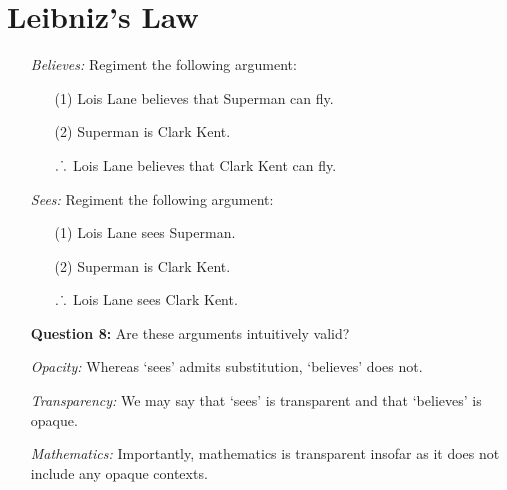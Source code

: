 \documentclass[a4paper, 11pt]{article} %
\def\therefore{\ensuremath{\ldotp\dot\,\ldotp}}
\begin{document}
\section*{Leibniz's Law}

\begin{enumerate}
  \item[\it Believes:] Regiment the following argument:
    \begin{itemize}
      \item[(1)] Lois Lane believes that Superman can fly.
      \item[(2)] Superman is Clark Kent.
      \item[$\therefore$] Lois Lane believes that Clark Kent can fly.
    \end{itemize}
  \item[\it Sees:] Regiment the following argument:
    \begin{itemize}
      \item[(1)] Lois Lane sees Superman.
      \item[(2)] Superman is Clark Kent.
      \item[$\therefore$] Lois Lane sees Clark Kent.
    \end{itemize}
  \item[\bf Question 8:] Are these arguments intuitively valid?
  \item[\it Opacity:] Whereas `sees' admits substitution, `believes' does not.
  \item[\it Transparency:] We may say that `sees' is transparent and that `believes' is opaque.
  \item[\it Mathematics:] Importantly, mathematics is transparent insofar as it does not include any opaque contexts.
\end{enumerate}


%
\end{document}

